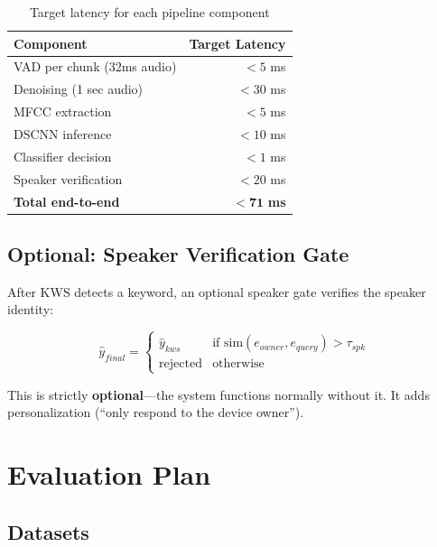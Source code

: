 \documentclass[12pt,a4paper]{report}
\begin{document}
\begin{table}[h]
\centering
\caption{Target latency for each pipeline component}
\label{tab:latency}
\begin{tabular}{lr}
\toprule
\textbf{Component} & \textbf{Target Latency} \\
\midrule
VAD per chunk (32ms audio) & $< 5$ ms \\
Denoising (1 sec audio) & $< 30$ ms \\
MFCC extraction & $< 5$ ms \\
DSCNN inference & $< 10$ ms \\
Classifier decision & $< 1$ ms \\
Speaker verification & $< 20$ ms \\
\midrule
\textbf{Total end-to-end} & $\mathbf{< 71}$ \textbf{ms} \\
\bottomrule
\end{tabular}
\end{table}


\section{Optional: Speaker Verification Gate}

After KWS detects a keyword, an optional speaker gate verifies the speaker
identity:

\begin{equation}
    \hat{y}_{final} = \begin{cases}
        \hat{y}_{kws} & \text{if } \text{sim}(e_{owner}, e_{query}) > \tau_{spk} \\
        \text{rejected} & \text{otherwise}
    \end{cases}
\end{equation}

This is strictly \textbf{optional}---the system functions normally without it.
It adds personalization (``only respond to the device owner'').


\chapter{Evaluation Plan}

\section{Datasets}
\end{document}
